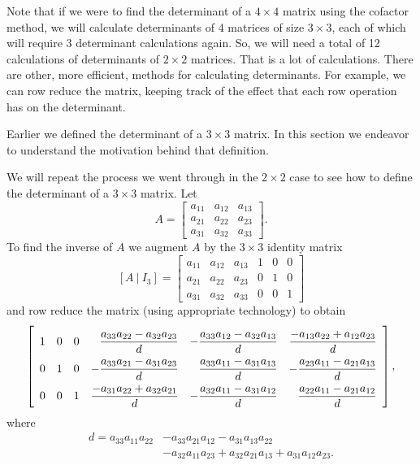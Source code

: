 Note that if we were to find the determinant of a $4\times 4$ matrix using the cofactor method, we will calculate determinants of 4 matrices of size $3\times 3$, each of which will require 3 determinant calculations again. So, we will need a total of 12 calculations of determinants of $2\times 2$ matrices. That is a lot of calculations. There are other, more efficient, methods for calculating determinants. For example, we can row reduce the matrix, keeping track of the effect that each row operation has on the determinant. 




Earlier we defined the determinant of a $3 \times 3$ matrix. In this section we endeavor to understand the motivation behind that definition.

We will repeat the process we went through in the $2 \times 2$ case to see how to define the determinant of a $3 \times 3$  matrix. Let
\[A =  \left[ \begin {array}{ccc} a_{11}&a_{12}&a_{13} \\ a_{21}&a_{22}&a_{23}\\ a_{31}&a_{32}&a_{33}\end {array} \right].\]
To find the inverse of $A$ we augment $A$ by the $3 \times 3$ identity matrix 
\[[A \ | \ I_3] = \left[ \begin {array}{cccccc} a_{11}&a_{12}&a_{13}&1&0&0 \\ a_{21}&a_{22}&a_{23}&0&1&0 \\ a_{31}&a_{32}&a_{33}&0&0&1 \end {array} \right]\]
and row reduce the matrix (using appropriate technology) to obtain
\[\renewcommand{\arraystretch}{2.0}  \left[ \begin{array}{rrrrrr} 1&0&0&\ds \frac{a_{33}a_{22}-a_{32}a_{23}}{d}& \ds -\frac{a_{33}a_{12}-a_{32}a_{13}}{d}& \ds \frac{-a_{13}a_{22}+a_{12}a_{23}}{d} \\ 0&1&0& \ds -\frac{a_{33}a_{21}-a_{31}a_{23}}{d}& \ds \frac{a_{33}a_{11}-a_{31}a_{13}}{d}& \ds -\frac{a_{23}a_{11}-a_{21}a_{13}}{d} \\
0&0&1& \ds \frac{-a_{31}a_{22}+a_{32}a_{21}}{d}& \ds -\frac{a_{32}a_{11}-a_{31}a_{12}}{d}& \ds \frac{a_{22}a_{11}-a_{21}a_{12}}{d} \end{array} \right],\]
where 
\begin{equation} \label{eq:4_a_3by3_det}
\begin{aligned}
d = a_{33}a_{11}a_{22}&-a_{33}a_{21}a_{12}-a_{31}a_{13}a_{22} \\
	&-a_{32}a_{11}a_{23}+a_{32}a_{21}a_{13}+a_{31}a_{12}a_{23}.
\end{aligned}
\end{equation}

